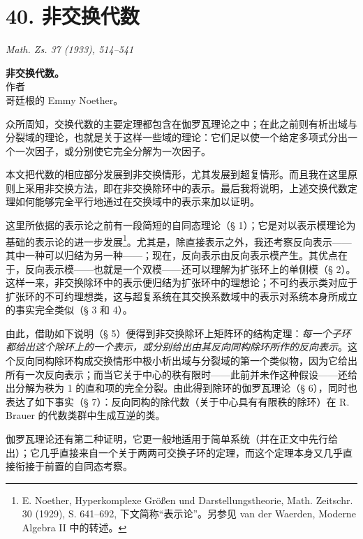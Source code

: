 \documentclass[11pt]{article}
\begin{document}
\setcounter{footnote}{0}

\section*{40. 非交换代数}

\begin{center}
\emph{Math. Zs. 37 (1933), 514--541}
\end{center}

\begin{center}
\textbf{非交换代数。}\\[0.5em]
作者\\[0.25em]
哥廷根的 Emmy Noether。
\end{center}

众所周知，交换代数的主要定理都包含在伽罗瓦理论之中；在此之前则有析出域与分裂域的理论，也就是关于这样一些域的理论：它们足以使一个给定多项式分出一个一次因子，或分别使它完全分解为一次因子。

本文把代数的相应部分发展到非交换情形，尤其发展到超复情形。而且我在这里原则上采用非交换方法，即在非交换除环中的表示。最后我将说明，上述交换代数定理如何能够完全平行地通过在交换域中的表示来加以证明。

这里所依据的表示论之前有一段简短的自同态理论（§ 1）；它是对以表示模理论为基础的表示论的进一步发展\footnote{E. Noether, Hyperkomplexe Größen und Darstellungstheorie, Math. Zeitschr. 30 (1929), S. 641--692, 下文简称“表示论”。另参见 van der Waerden, Moderne Algebra II 中的转述。}。尤其是，除直接表示之外，我还考察反向表示——其中一种可以归结为另一种——；现在，反向表示由反向表示模产生。其优点在于，反向表示模——也就是一个双模——还可以理解为扩张环上的单侧模（§ 2）。这样一来，非交换除环中的表示便归结为扩张环中的理想论；不可约表示类对应于扩张环的不可约理想类，这与超复系统在其交换系数域中的表示对系统本身所成立的事实完全类似（§ 3 和 4）。

由此，借助如下说明（§ 5）便得到非交换除环上矩阵环的结构定理：\emph{每一个子环都给出这个除环上的一个表示，或分别给出由其反向同构除环所作的反向表示}。这个反向同构除环构成交换情形中极小析出域与分裂域的第一个类似物，因为它给出所有一次反向表示；而当它关于中心的秩有限时——此前并未作这种假设——还给出分解为秩为 1 的直和项的完全分裂。由此得到除环的伽罗瓦理论（§ 6），同时也表达了如下事实（§ 7）：反向同构的除代数（关于中心具有有限秩的除环）在 R. Brauer 的代数类群中生成互逆的类。

伽罗瓦理论还有第二种证明，它更一般地适用于简单系统（并在正文中先行给出）；它几乎直接来自一个关于两两可交换子环的定理，而这个定理本身又几乎直接衔接于前置的自同态考察。
\end{document}

